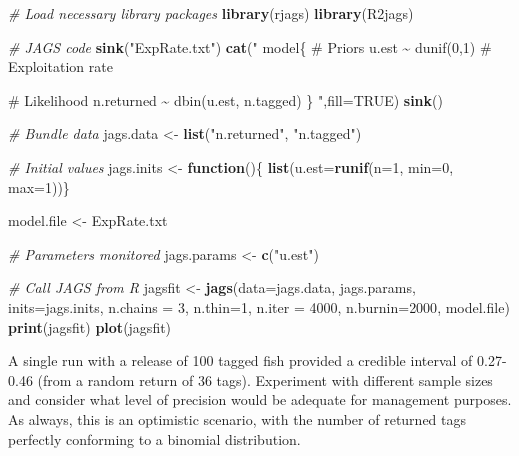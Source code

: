 \documentclass[
]{krantz}
\makeatletter
\newenvironment{Shaded}{\begin{snugshade}}{\end{snugshade}}
\newcommand{\AttributeTok}[1]{\textcolor[rgb]{0.27,0.27,0.27}{#1}}
\newcommand{\CommentTok}[1]{\textcolor[rgb]{0.37,0.37,0.37}{\textit{#1}}}
\newcommand{\ConstantTok}[1]{\textcolor[rgb]{0.37,0.37,0.37}{#1}}
\newcommand{\ControlFlowTok}[1]{\textcolor[rgb]{0.27,0.27,0.27}{\textbf{#1}}}
\newcommand{\DecValTok}[1]{\textcolor[rgb]{0.06,0.06,0.06}{#1}}
\newcommand{\FunctionTok}[1]{\textcolor[rgb]{0.27,0.27,0.27}{\textbf{#1}}}
\newcommand{\NormalTok}[1]{#1}
\newcommand{\OtherTok}[1]{\textcolor[rgb]{0.37,0.37,0.37}{#1}}
\newcommand{\StringTok}[1]{\textcolor[rgb]{0.5,0.5,0.5}{#1}}
\newenvironment{kframe}{%
\medskip{}
\setlength{\fboxsep}{.8em}
 \def\at@end@of@kframe{}%
 \ifinner\ifhmode%
  \def\at@end@of@kframe{\end{minipage}}%
  \begin{minipage}{\columnwidth}%
 \fi\fi%
 \def\FrameCommand##1{\hskip\@totalleftmargin \hskip-\fboxsep
 \colorbox{shadecolor}{##1}\hskip-\fboxsep
     \hskip-\linewidth \hskip-\@totalleftmargin \hskip\columnwidth}%
 \MakeFramed {\advance\hsize-\width
   \@totalleftmargin\z@ \linewidth\hsize
   \@setminipage}}%
 {\par\unskip\endMakeFramed%
 \at@end@of@kframe}
\renewenvironment{Shaded}{\begin{kframe}}{\end{kframe}}
\makeatother
\begin{document}
\begin{Shaded}
\begin{Highlighting}[]
\CommentTok{\# Load necessary library packages}
\FunctionTok{library}\NormalTok{(rjags)}
\FunctionTok{library}\NormalTok{(R2jags)}

\CommentTok{\# JAGS code}
\FunctionTok{sink}\NormalTok{(}\StringTok{"ExpRate.txt"}\NormalTok{)}
\FunctionTok{cat}\NormalTok{(}\StringTok{"}
\StringTok{model\{}
\StringTok{    \# Priors}
\StringTok{    u.est \textasciitilde{} dunif(0,1)  \# Exploitation rate}

\StringTok{    \# Likelihood}
\StringTok{    n.returned \textasciitilde{} dbin(u.est, n.tagged)}
\StringTok{\}}
\StringTok{    "}\NormalTok{,}\AttributeTok{fill=}\ConstantTok{TRUE}\NormalTok{)}
\FunctionTok{sink}\NormalTok{()}

\CommentTok{\# Bundle data}
\NormalTok{jags.data }\OtherTok{\textless{}{-}} \FunctionTok{list}\NormalTok{(}\StringTok{"n.returned"}\NormalTok{, }\StringTok{"n.tagged"}\NormalTok{)}

\CommentTok{\# Initial values}
\NormalTok{jags.inits }\OtherTok{\textless{}{-}} \ControlFlowTok{function}\NormalTok{()\{ }\FunctionTok{list}\NormalTok{(}\AttributeTok{u.est=}\FunctionTok{runif}\NormalTok{(}\AttributeTok{n=}\DecValTok{1}\NormalTok{, }\AttributeTok{min=}\DecValTok{0}\NormalTok{, }\AttributeTok{max=}\DecValTok{1}\NormalTok{))\}}

\NormalTok{model.file }\OtherTok{\textless{}{-}} \StringTok{\textquotesingle{}ExpRate.txt\textquotesingle{}}

\CommentTok{\# Parameters monitored}
\NormalTok{jags.params }\OtherTok{\textless{}{-}} \FunctionTok{c}\NormalTok{(}\StringTok{"u.est"}\NormalTok{)}

\CommentTok{\# Call JAGS from R}
\NormalTok{jagsfit }\OtherTok{\textless{}{-}} \FunctionTok{jags}\NormalTok{(}\AttributeTok{data=}\NormalTok{jags.data, jags.params, }\AttributeTok{inits=}\NormalTok{jags.inits,}
                \AttributeTok{n.chains =} \DecValTok{3}\NormalTok{, }\AttributeTok{n.thin=}\DecValTok{1}\NormalTok{, }\AttributeTok{n.iter =} \DecValTok{4000}\NormalTok{, }\AttributeTok{n.burnin=}\DecValTok{2000}\NormalTok{,}
\NormalTok{                model.file)}
\FunctionTok{print}\NormalTok{(jagsfit)}
\FunctionTok{plot}\NormalTok{(jagsfit)}
\end{Highlighting}
\end{Shaded}

A single run with a release of 100 tagged fish provided a credible interval of 0.27-0.46 (from a random return of 36 tags). Experiment with different sample sizes and consider what level of precision would be adequate for management purposes. As always, this is an optimistic scenario, with the number of returned tags perfectly conforming to a binomial distribution.
\end{document}
